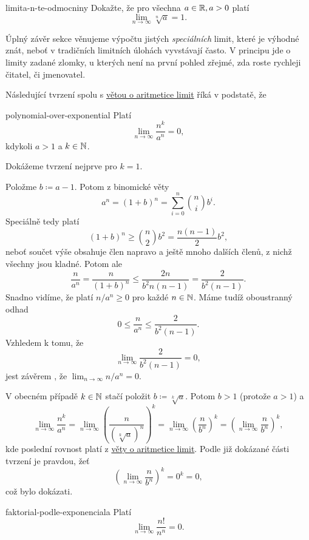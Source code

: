 \begin{exercise}{}{limita-n-te-odmocniny}
 Dokažte, že pro všechna $a \in \mathbb{R}, a > 0$ platí
 \[
  \lim_{n \to \infty} \sqrt[n]{a} = 1.
 \]
\end{exercise}

Úplný závěr sekce věnujeme výpočtu jistých \emph{speciálních} limit, které je
výhodné znát, neboť v tradičních limitních úlohách vyvstávají často. V principu
jde o limity zadané zlomky, u kterých není na první pohled zřejmé, zda roste
rychleji čitatel, či jmenovatel.

Následující tvrzení spolu s \hyperref[thm:aritmetika-limit]{větou o aritmetice
limit} říká v podstatě, že 

\begin{lemma}{}{polynomial-over-exponential}
 Platí
 \[
  \lim_{n \to \infty} \frac{n^{k}}{a^{n}} = 0,
 \]
 kdykoli $a > 1$ a $k \in \mathbb{N}$.
\end{lemma}
\begin{lemproof}
 Dokážeme tvrzení nejprve pro $k = 1$.

 Položme $b \coloneqq a - 1$. Potom z binomické věty
 \[
  a^{n} = (1 + b)^{n} = \sum_{i=0}^n \binom{n}{i}b^{i}.
 \]
 Speciálně tedy platí
 \[
  (1 + b)^{n} \geq \binom{n}{2}b^2 = \frac{n(n-1)}{2}b^2,
 \]
 neboť součet výše obsahuje člen napravo a ještě mnoho dalších členů, z nichž
 všechny jsou kladné. Potom ale
 \[
  \frac{n}{a^{n}} = \frac{n}{(1+b)^{n}} \leq \frac{2n}{b^2n(n-1)} =
  \frac{2}{b^2(n-1)}.
 \]
 Snadno vidíme, že platí $n / a^{n} \geq 0$ pro každé $n \in \mathbb{N}$. Máme tudíž
 oboustranný odhad
 \[
  0 \leq \frac{n}{a^{n}} \leq \frac{2}{b^2(n-1)}.
 \]
 Vzhledem k tomu, že
 \[
  \lim_{n \to \infty} \frac{2}{b^2(n-1)} = 0,
 \]
 jest závěrem , že $\lim_{n \to \infty} n
 / a^{n} = 0$.

 V obecném případě $k \in \mathbb{N}$ stačí položit $b \coloneqq \sqrt[k]{a}$. Potom $b
 > 1$ (protože $a > 1$) a
 \[
  \lim_{n \to \infty} \frac{n^{k}}{a^{n}} = \lim_{n \to \infty} \left(
  \frac{n}{(\sqrt[k]{a})^{n}} \right)^{k} = \lim_{n \to \infty} \left(
  \frac{n}{b^{n}} \right)^{k} = \left( \lim_{n \to \infty} \frac{n}{b^{n}}
  \right)^{k},
 \]
 kde poslední rovnost platí z \hyperref[thm:aritmetika-limit]{věty o aritmetice
 limit}. Podle již dokázané části tvrzení je pravdou, žeť
 \[
  \left( \lim_{n \to \infty} \frac{n}{b^{n}} \right)^{k} = 0^{k} = 0,
 \]
 což bylo dokázati.
\end{lemproof}
\begin{lemma}{}{faktorial-podle-exponenciala}
 Platí
 \[
  \lim_{n \to \infty} \frac{n!}{n^{n}} = 0.
 \]
\end{lemma}
